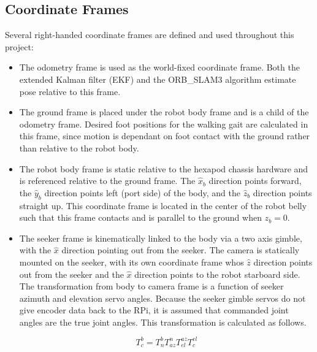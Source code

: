 \subsection{ Coordinate Frames }

Several right-handed coordinate frames are defined and used throughout this project:

\begin{itemize}
    \item The odometry frame is used as the world-fixed coordinate frame. Both the extended Kalman filter (EKF) and the ORB\_SLAM3 algorithm estimate pose relative to this frame.

    \item The ground frame is placed under the robot body frame and is a child of the odometry frame. Desired foot positions for the walking gait are calculated in this frame, since motion is dependant on foot contact with the ground rather than relative to the robot body.

    \item The robot body frame is static relative to the hexapod chassis hardware and is referenced relative to the ground frame. The $\hat{x}_b$ direction points forward, the $\hat{y}_b$ direction points left (port side) of the body, and the $\hat{z}_b$ direction points straight up. This coordinate frame is located in the center of the robot belly such that this frame contacts and is parallel to the ground when $z_b = 0$.

    \item The seeker frame is kinematically linked to the body via a two axis gimble, with the $\hat{x}$ direction pointing out from the seeker. The camera is statically mounted on the seeker, with its own coordinate frame whos $\hat{z}$ direction points out from the seeker and the $\hat{x}$ direction points to the robot starboard side. The transformation from body to camera frame is a function of seeker azimuth and elevation servo angles. Because the seeker gimble servos do not give encoder data back to the RPi, it is assumed that commanded joint angles are the true joint angles. This transformation is calculated as follows.

    \[
    T^b_c = T^b_n T^n_{az} T^{az}_{el} T^{el}_{c}
    \]


\end{itemize}
